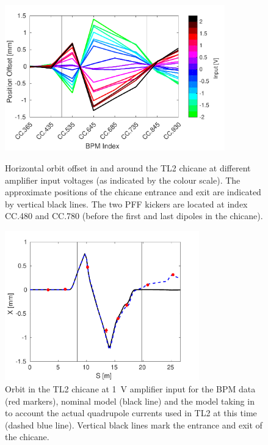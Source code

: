 \begin{figure}
  \centering
  \includegraphics[width=0.85\textwidth]{Figures/commissioning/HOrbitVsInput}
  \caption{Horizontal orbit offset in and around the TL2 chicane at different amplifier input voltages (as indicated by the colour scale). The approximate positions of the chicane entrance and exit are indicated by vertical black lines. The two PFF kickers are located at index CC.480 and CC.780 (before the first and last dipoles in the chicane).}
  \label{f:HOrbitVsInput}
    \includegraphics[width=0.75\textwidth]{Figures/commissioning/orbClosureVsQuadModel}
  \caption{Orbit in the TL2 chicane at 1~V amplifier input for the BPM data (red markers), nominal model (black line) and the model taking in to account the actual quadrupole currents used in TL2 at this time (dashed blue line). Vertical black lines mark the entrance and exit
   of the chicane.}
  \label{f:orbClosureVsQuadModel}
\end{figure}

